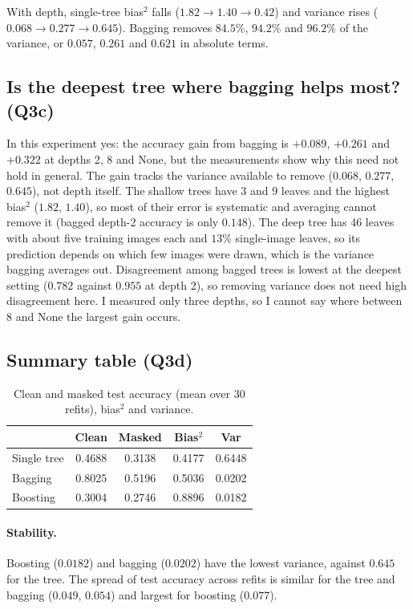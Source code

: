 \documentclass[10pt,twocolumn,letterpaper]{article}
\begin{document}
With depth, single-tree bias$^2$ falls ($1.82\to1.40\to0.42$) and variance rises ($0.068\to0.277\to0.645$).
Bagging removes $84.5\%$, $94.2\%$ and $96.2\%$ of the variance, or $0.057$, $0.261$ and $0.621$ in absolute terms.

\subsection{Is the deepest tree where bagging helps most? (Q3c)}
In this experiment yes: the accuracy gain from bagging is $+0.089$, $+0.261$ and $+0.322$ at depths 2, 8 and None, but the measurements show why this need not hold in general.
The gain tracks the variance available to remove ($0.068$, $0.277$, $0.645$), not depth itself.
The shallow trees have 3 and 9 leaves and the highest bias$^2$ ($1.82$, $1.40$), so most of their error is systematic and averaging cannot remove it (bagged depth-2 accuracy is only $0.148$).
The deep tree has 46 leaves with about five training images each and $13\%$ single-image leaves, so its prediction depends on which few images were drawn, which is the variance bagging averages out.
Disagreement among bagged trees is lowest at the deepest setting ($0.782$ against $0.955$ at depth 2), so removing variance does not need high disagreement here.
I measured only three depths, so I cannot say where between 8 and None the largest gain occurs.

\subsection{Summary table (Q3d)}
\begin{table}[htbp]
\centering
\caption{Clean and masked test accuracy (mean over 30 refits), bias$^2$ and variance.}
\label{tab:q3d}
\small
\setlength{\tabcolsep}{6pt}
\begin{tabular}{lcccc}
\toprule
 & Clean & Masked & Bias$^2$ & Var \\
\midrule
Single tree & 0.4688 & 0.3138 & 0.4177 & 0.6448 \\
Bagging     & 0.8025 & 0.5196 & 0.5036 & 0.0202 \\
Boosting    & 0.3004 & 0.2746 & 0.8896 & 0.0182 \\
\bottomrule
\end{tabular}
\end{table}

\paragraph{Stability.} Boosting ($0.0182$) and bagging ($0.0202$) have the lowest variance, against $0.645$ for the tree.
The spread of test accuracy across refits is similar for the tree and bagging ($0.049$, $0.054$) and largest for boosting ($0.077$).
\end{document}
